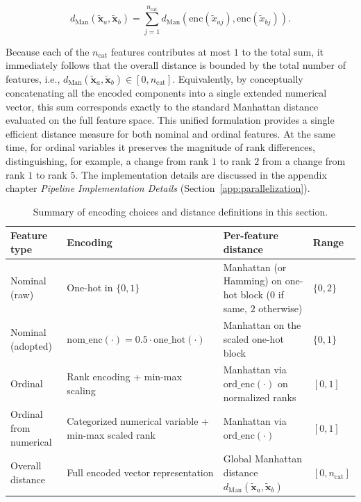 \begin{equation}
  d_{\mathrm{Man}}(\tilde{\mathbf{x}}_a, \tilde{\mathbf{x}}_b) = \sum_{j=1}^{n_{\mathrm{cat}}} d_{\mathrm{Man}}\!\left(\mathrm{enc}(\tilde{x}_{aj}), \mathrm{enc}(\tilde{x}_{bj})\right).
\end{equation}

Because each of the $n_{\mathrm{cat}}$ features contributes at most $1$ to the total sum, it immediately follows that the overall distance is bounded by the total number of features, i.e., $d_{\mathrm{Man}}(\tilde{\mathbf{x}}_a, \tilde{\mathbf{x}}_b) \in [0, n_{\mathrm{cat}}]$. Equivalently, by conceptually concatenating all the encoded components into a single extended numerical vector, this sum corresponds exactly to the standard Manhattan distance evaluated on the full feature space. This unified formulation provides a single efficient distance measure for both nominal and ordinal features. At the same time, for ordinal variables it preserves the magnitude of rank differences, distinguishing, for example, a change from rank $1$ to rank $2$ from a change from rank $1$ to rank $5$. The implementation details are discussed in the appendix chapter \emph{Pipeline Implementation Details} (Section~\ref{app:parallelization}).

\begin{table}[H]
\centering
\renewcommand{\arraystretch}{1.2}
\caption{Summary of encoding choices and distance definitions in this section.}
\label{tab:encoding-distance-summary}
  \begin{tabular}{>{\raggedright\arraybackslash}p{} >{\raggedright\arraybackslash}p{} >{\raggedright\arraybackslash}p{} >{\raggedright\arraybackslash}p{}}
    \toprule
    \textbf{Feature type} & \textbf{Encoding} & \textbf{Per-feature distance} & \textbf{Range} \\
    \midrule
    Nominal (raw) & One-hot in $\{0,1\}$ & Manhattan (or Hamming) on one-hot block ($0$ if same, $2$ otherwise) & $\{0,2\}$ \\
    Nominal (adopted) & $\mathrm{nom\_enc}(\cdot) = 0.5 \cdot \mathrm{one\_hot}(\cdot)$ & Manhattan on the scaled one-hot block & $\{0,1\}$ \\
    Ordinal & Rank encoding + min-max scaling & Manhattan via $\mathrm{ord\_enc}(\cdot)$ on normalized ranks & $[0,1]$ \\
    Ordinal from numerical & Categorized numerical variable + min-max scaled rank & Manhattan via $\mathrm{ord\_enc}(\cdot)$ & $[0,1]$ \\
    Overall distance & Full encoded vector representation & Global Manhattan distance $d_{\mathrm{Man}}(\tilde{\mathbf{x}}_a, \tilde{\mathbf{x}}_b)$ & $[0, n_{\mathrm{cat}}]$ \\
    \bottomrule
  \end{tabular}
  \renewcommand{\arraystretch}{1.0}
\end{table}

